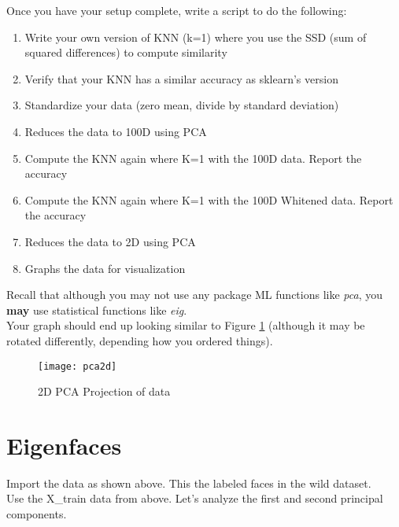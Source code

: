 \documentclass[12pt]{article}
\begin{document}
\noindent
Once you have your setup complete, write a script to do the following:
\begin{enumerate}
  \item Write your own version of KNN (k=1) where you use the SSD (sum of squared differences) to compute similarity
  \item Verify that your KNN has a similar accuracy as sklearn's version
  \item Standardize your data (zero mean, divide by standard deviation)
  \item Reduces the data to 100D using PCA
  \item Compute the KNN again where K=1 with the 100D data.  Report the accuracy
  \item Compute the KNN again where K=1 with the 100D Whitened data.  Report the accuracy
   \item Reduces the data to 2D using PCA
  \item Graphs the data for visualization
\end{enumerate}

\noindent
Recall that although you may not use any package ML functions like \emph{pca}, you \textbf{may} use statistical functions like \emph{eig}.\\

\noindent
Your graph should end up looking similar to Figure \ref{PCA} (although it may be rotated differently, depending how you ordered things).
\begin{figure}[H]
\begin{center}
\texttt{[image: pca2d]}
\caption{2D PCA Projection of data}
\label{PCA}
\end{center}
\end{figure}

\newpage
\section{Eigenfaces}\label{eigenface}
Import the data as shown above.  This the labeled faces in the wild dataset.  \\
Use the X\_train data from above.  Let's analyze the first and second principal components.\\

\noindent
\end{document}
